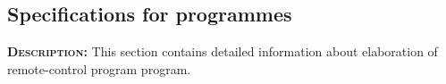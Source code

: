 \subsection{Specifications for programmes}
	\textsc{\textbf{Description:}} This section contains detailed information about elaboration of remote-control program program.
	
	
	